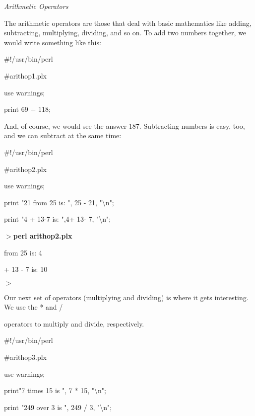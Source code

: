 \documentclass[a4paper,11pt]{book}
\begin{document}
\noindent 

\noindent \textit{Arithmetic Operators}

\noindent The arithmetic operators are those that deal with basic mathematics like adding, subtracting, multiplying, dividing, and so on. To add two numbers together, we would write something like this:

\noindent 

\noindent 

\noindent \#!/usr/bin/perl

\noindent \#arithop1.plx

\noindent use warnings;

\noindent print 69 + 118;

\noindent 

\noindent And, of course, we would see the answer 187. Subtracting numbers is easy, too, and we can subtract at the same time:

\noindent 

\noindent 

\noindent \#!/usr/bin/perl

\noindent \#arithop2.plx

\noindent use warnings;

\noindent print "21 from 25 is: ", 25 - 21, "\textbackslash n";

\noindent print "4 + 13-7 is: ",4+ 13- 7, "\textbackslash n";

\noindent 

\noindent $>$\textbf{perl arithop2.plx}

 from 25 is: 4

 + 13 - 7 is: 10

\noindent $>$

\noindent 

\noindent Our next set of operators (multiplying and dividing) is where it gets interesting. We use the * and /

\noindent operators to multiply and divide, respectively.

\noindent 

\noindent 

\noindent \#!/usr/bin/perl

\noindent \#arithop3.plx

\noindent use warnings;

\noindent print"7 times 15 is ", 7 * 15, "\textbackslash n";

\noindent print "249 over 3 is ", 249 / 3, "\textbackslash n";
\end{document}
